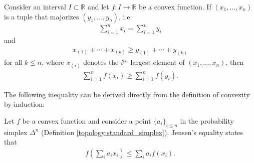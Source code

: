     \begin{theorem}
        Consider an interval $I\subset\mathbb{R}$ and let $f:I\rightarrow\mathbb{R}$ be a convex function. If $(x_1,\ldots,x_n)$ is a tuple that majorizes $(y_1,\ldots,y_n)$, i.e.
        \begin{gather}
            \sum_{i=1}^nx_i = \sum_{i=1}^ny_i
        \end{gather}
        and
        \begin{gather}
            x_{(1)} + \cdots + x_{(k)}\geq y_{(1)} + \cdots + y_{(k)}
        \end{gather}
        for all $k\leq n$, where $x_{(i)}$ denotes the $i^{th}$ largest element of $(x_1,\ldots,x_n)$, then
        \begin{gather}
            \sum_{i=1}^nf(x_i)\geq\sum_{i=1}^nf(y_i).
        \end{gather}
    \end{theorem}
    The following inequality can be derived directly from the definition of convexity by induction:
    \begin{theorem}\label{calculus:jensen_inequality}
        Let $f$ be a convex function and consider a point $\{a_i\}_{i\leq n}$ in the probability simplex $\Delta^n$ (Definition \ref{topology:standard_simplex}). Jensen's equality states that
        \begin{gather}
            f\left(\sum_ia_ix_i\right)\leq\sum_ia_if(x_i).
        \end{gather}
    \end{theorem}

